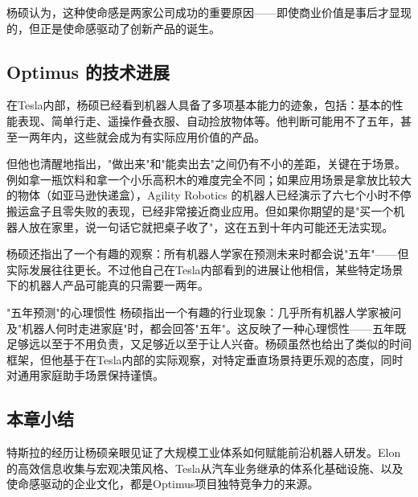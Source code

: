 杨硕认为，这种使命感是两家公司成功的重要原因——即使商业价值是事后才显现的，但正是使命感驱动了创新产品的诞生。

\subsection{Optimus 的技术进展}

在Tesla内部，杨硕已经看到机器人具备了多项基本能力的迹象，包括：基本的性能表现、简单行走、遥操作叠衣服、自动捡放物体等。他判断可能用不了五年，甚至一两年内，这些就会成为有实际应用价值的产品。

但他也清醒地指出，"做出来"和"能卖出去"之间仍有不小的差距，关键在于场景。例如拿一瓶饮料和拿一个小乐高积木的难度完全不同；如果应用场景是拿放比较大的物体（如亚马逊快递盒），Agility Robotics 的机器人已经演示了六七个小时不停搬运盒子且零失败的表现，已经非常接近商业应用。但如果你期望的是"买一个机器人放在家里，说一句话它就把桌子收了"，这在五到十年内可能还无法实现。

杨硕还指出了一个有趣的观察：所有机器人学家在预测未来时都会说"五年"——但实际发展往往更长。不过他自己在Tesla内部看到的进展让他相信，某些特定场景下的机器人产品可能真的只需要一两年。

\begin{knowledgebox}{"五年预测"的心理惯性}
杨硕指出一个有趣的行业现象：几乎所有机器人学家被问及"机器人何时走进家庭"时，都会回答"五年"。这反映了一种心理惯性——五年既足够远以至于不用负责，又足够近以至于让人兴奋。杨硕虽然也给出了类似的时间框架，但他基于在Tesla内部的实际观察，对特定垂直场景持更乐观的态度，同时对通用家庭助手场景保持谨慎。
\end{knowledgebox}

\subsection{本章小结}

特斯拉的经历让杨硕亲眼见证了大规模工业体系如何赋能前沿机器人研发。Elon的高效信息收集与宏观决策风格、Tesla从汽车业务继承的体系化基础设施、以及使命感驱动的企业文化，都是Optimus项目独特竞争力的来源。


